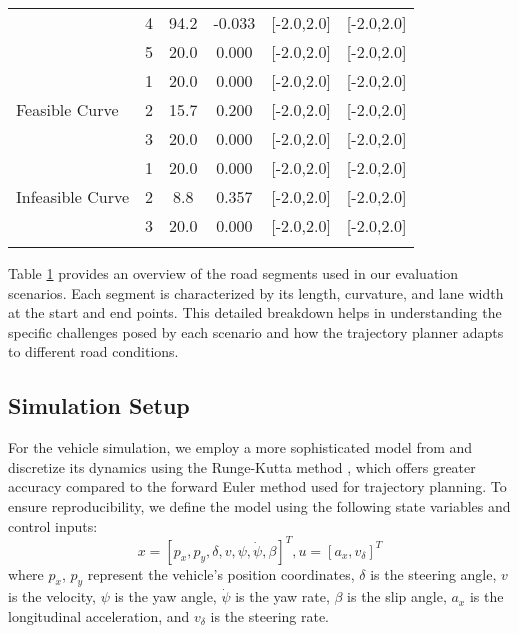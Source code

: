 \begin{longtable}{l c c c c c}
	                                  & 4                & 94.2            & -0.033             & [-2.0,2.0]                              & [-2.0,2.0]   \\
	                                  & 5                & 20.0            & 0.000              & [-2.0,2.0]                              & [-2.0,2.0]   \\
	\midrule
	\multirow{3}{*}{Feasible Curve}   & 1                & 20.0            & 0.000              & [-2.0,2.0]                              & [-2.0,2.0]   \\
	                                  & 2                & 15.7            & 0.200              & [-2.0,2.0]                              & [-2.0,2.0]   \\
	                                  & 3                & 20.0            & 0.000              & [-2.0,2.0]                              & [-2.0,2.0]   \\
	\midrule
	\multirow{3}{*}{Infeasible Curve} & 1                & 20.0            & 0.000              & [-2.0,2.0]                              & [-2.0,2.0]   \\
	                                  & 2                & 8.8             & 0.357              & [-2.0,2.0]                              & [-2.0,2.0]   \\
	                                  & 3                & 20.0            & 0.000              & [-2.0,2.0]                              & [-2.0,2.0]   \\
	\midrule
	\label{tab:road_segments}
\end{longtable}

Table \ref{tab:road_segments} provides an overview of the road segments used in our evaluation scenarios.
Each segment is characterized by its length, curvature, and lane width at the start and end points.
This detailed breakdown helps in understanding the specific challenges posed by each scenario and how the trajectory planner adapts to different road
conditions.

\subsection{Simulation Setup} \label{subsec:simulation}

For the vehicle simulation, we employ a more sophisticated model from \cite{noauthor_dateien_2021} and discretize its dynamics using the Runge-Kutta
method \cite{griffiths_rungekutta_2010}, which offers greater accuracy compared to the forward Euler method used for trajectory planning.
To ensure reproducibility, we define the model using the following state variables and control inputs: \[ x = [p_x, p_y, \delta, v, \psi, \dot{\psi},
	\beta]^T, u = [a_x, v_{\delta}]^T \] where $p_x$, $p_y$ represent the vehicle's position coordinates, $\delta$ is the steering angle, $v$ is the
velocity, $\psi$ is the yaw angle, $\dot{\psi}$ is the yaw rate, $\beta$ is the slip angle, $a_x$ is the longitudinal acceleration, and $v_\delta$ is
the steering rate.

